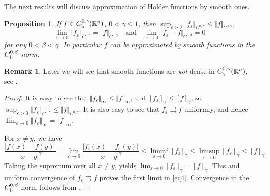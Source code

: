 \documentclass[intlimits,12pt,reqno]{amsart}
\newcommand{\bbbr}{\mathbb R}
\newcommand{\R}{\mathbb R}
\newcommand{\eps}{\varepsilon}
\numberwithin{equation}{section}
\newtheorem{proposition}[theorem]{Proposition}
\theoremstyle{definition}
\newtheorem{remark}[theorem]{Remark}
\begin{document}
The next results will discuss approximation of H\"older functions by smooth ones. 
\begin{proposition}
\label{T3}
If $f\in C_{\rm b}^{0,\gamma}(\R^n)$, $0<\gamma\leq 1$, then
$\sup_{\eps>0}\Vert f_\eps\Vert_{C^{0,\gamma}}\leq\Vert f\Vert_{C^{0,\gamma}}$, 
\begin{equation}
\label{eq4}
\lim_{\eps\to 0}\Vert f_\eps\Vert_{C^{0,\gamma}}=\Vert f\Vert_{C^{0,\gamma}}
\quad
\text{and}
\quad
\lim_{\eps\to 0}\Vert f_\eps-f\Vert_{C^{0,\beta}}=0
\end{equation}
for any $0<\beta<\gamma$.
In particular $f$ can be approximated by smooth functions
in the $C_{\rm b}^{0,\beta}$ norm.
\end{proposition}
\begin{remark}
Later we will see that smooth functions are {\em not} dense in $C_{\rm b}^{0,\gamma}(\bbbr^n)$, see .
\end{remark}
\begin{proof}
It is easy to see that $\Vert f_\eps\Vert_\infty\leq\Vert f\Vert_\infty$, and  $[f_\eps]_{\gamma}\leq [f]_{\gamma}$, so
$\sup_{\eps>0}\Vert f_\eps\Vert_{C^{0,\gamma}}\leq\Vert f\Vert_{C^{0,\gamma}}$.
It is also easy to see that $f_\eps\rightrightarrows f$ uniformly, and hence $\lim_{\eps\to 0}\Vert f_\eps\Vert_\infty=\Vert f\Vert_\infty$.

For $x\neq y$, we have
$$
\frac{|f(x)-f(y)|}{|x-y|^\gamma}=
\lim_{\eps\to 0} \frac{|f_\eps(x)-f_\eps(y)|}{|x-y|^\gamma}
\leq
\liminf_{\eps\to 0}[f_\eps]_{\gamma} \leq \limsup_{\eps\to 0}[f_\eps]_{\gamma} \leq [f]_{\gamma}.
$$
Taking the supremum over all $x\neq y$, yields $\lim_{\eps\to 0}[f_\eps]_{\gamma}=[f]_{\gamma}$. This and uniform convergence of $f_\eps\rightrightarrows f$ proves the first limit in \eqref{eq4}. Convergence in 
the $C_{\rm b}^{0,\beta}$ norm follows from .
\end{proof}
\end{document}

